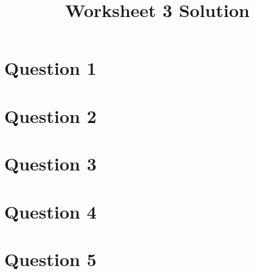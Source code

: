 \documentclass[12pt]{article}
\begin{document}
\title{Worksheet 3 Solution}
\maketitle

\section*{Question 1}

\section*{Question 2}

\section*{Question 3}

\section*{Question 4}

\section*{Question 5}
\end{document}
